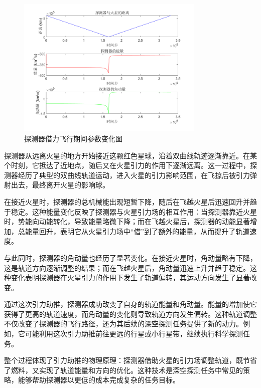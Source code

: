 \documentclass[12pt,a4paper]{article}
\begin{document}
\begin{figure}[H]
    \centering
    \includegraphics[width=0.8\textwidth]{images/parameter.png}
    \caption{探测器借力飞行期间参数变化图}
\end{figure}

探测器从远离火星的地方开始接近这颗红色星球，沿着双曲线轨迹逐渐靠近。在某个时刻，它抵达了近地点，随后又在火星引力的作用下逐渐远离。这一过程中，探测器经历了典型的双曲线轨道运动，进入火星的引力影响范围，在飞掠后被引力弹射出去，最终离开火星的影响球。

在接近火星时，探测器的总机械能出现短暂下降，随后在飞越火星后迅速回升并趋于稳定。这种能量变化反映了探测器与火星引力场的相互作用：当探测器靠近火星时，势能向动能转化，导致能量略微下降；而在飞越火星后，探测器的动能显著增加，总能量回升，表明它从火星引力场中“借”到了额外的能量，从而提升了轨道速度。

与此同时，探测器的角动量也经历了显著变化。在接近火星时，角动量略有下降，这是轨道方向逐渐调整的结果；而在飞越火星后，角动量迅速上升并趋于稳定。这种变化表明探测器在火星引力的作用下发生了轨道偏转，其运动方向发生了显著改变。

通过这次引力助推，探测器成功改变了自身的轨道能量和角动量。能量的增加使它获得了更高的轨道速度，而角动量的变化则导致轨道方向发生偏转。这种轨道调整不仅改变了探测器的飞行路径，还为其后续的深空探测任务提供了新的动力。例如，它可能利用这次引力助推前往更远的行星或小行星带，继续执行科学探测任务。

整个过程体现了引力助推的物理原理：探测器借助火星的引力场调整轨道，既节省了燃料，又实现了轨道能量和方向的优化。这种技术是深空探测任务中常见的策略，能够帮助探测器以更低的成本完成复杂的任务目标。
\end{document}
